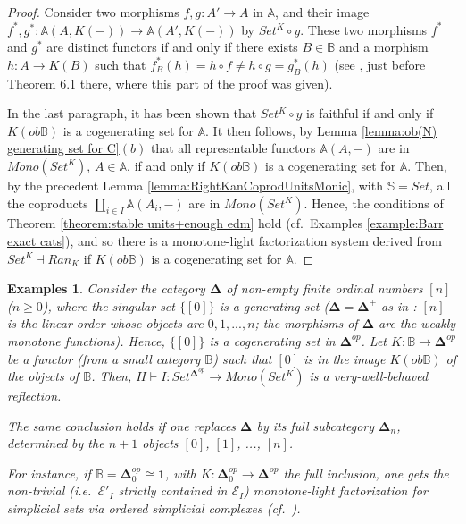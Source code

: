 \documentclass[12pt,a4paper]{amsart}
\newtheorem{examples}[example]{Examples}
\theoremstyle{definition}
\begin{document}
\begin{proof}
Consider two morphisms $f,g:A'\rightarrow A$ in $\mathbb{A}$, and their image $f^*,g^*:\mathbb{A}(A,K(-))\rightarrow \mathbb{A}(A',K(-))$ by $Set^K\circ y$. These two morphisms $f^*$ and $g^*$ are distinct functors if and only if there exists $B\in\mathbb{B}$ and a morphism $h:A\rightarrow K(B)$ such that $f^*_B(h)=h\circ f\neq h\circ g=g^*_B(h)$ (see \cite{X:concordant&monotone}, just before Theorem 6.1 there, where this part of the proof was given).

In the last paragraph, it has been shown that $Set^K\circ y$ is faithful if and only if $K(ob\mathbb{B})$ is a cogenerating set for $\mathbb{A}$. It then follows, by Lemma \ref{lemma:ob(N) generating set for C}$(b)$ that all representable functors $\mathbb{A}(A,-)$ are in $Mono(Set^K)$, $A\in\mathbb{A}$, if and only if $K(ob\mathbb{B})$ is a cogenerating set for $\mathbb{A}$. Then, by the precedent Lemma \ref{lemma:RightKanCoprodUnitsMonic}, with $\mathbb{S}=Set$, all the coproducts $\coprod_{i\in I}\mathbb{A}(A_i,-)$ are in $Mono(Set^K)$. Hence, the conditions of Theorem \ref{theorem:stable units+enough edm} hold (cf.\ Examples \ref{example:Barr exact cats}), and so there is a monotone-light factorization system derived from $Set^K\dashv Ran_K$ if $K(ob\mathbb{B})$ is a cogenerating set for $\mathbb{A}$.\end{proof}

\begin{examples}\label{example:m-l fact simplicial sets}
Consider the category $\mathbf{\Delta}$ of non-empty finite ordinal numbers $[n]$ ($n\geq 0$), where the singular set $\{[0]\}$ is a generating set ($\mathbf{\Delta}=\mathbf{\Delta}^+$ as in \cite[VII.5]{SM:cat}: $[n]$ is the linear order whose objects are $0,1,...,n$; the morphisms of $\mathbf{\Delta}$ are the weakly monotone functions). Hence, $\{[0]\}$ is a cogenerating set in $\mathbf{\Delta}^{op}$. Let $K:\mathbb{B}\rightarrow \mathbf{\Delta}^{op}$ be a functor (from a small category $\mathbb{B}$) such that $[0]$ is in the image $K(ob\mathbb{B})$ of the objects of $\mathbb{B}$. Then, $H\vdash I:Set^{\mathbf{\Delta}^{op}}\rightarrow Mono(Set^K)$ is a very-well-behaved reflection.

The same conclusion holds if one replaces $\mathbf{\Delta}$ by its full subcategory $\mathbf{\Delta}_n$, determined by the $n+1$ objects $[0]$, $[1]$, ..., $[n]$.

For instance, if $\mathbb{B}=\mathbf{\Delta}^{op}_0\cong \mathbf{1}$, with $K:\mathbf{\Delta}^{op}_0\rightarrow\mathbf{\Delta}^{op}$ the full inclusion, one gets the non-trivial (i.e.\ $\mathcal{E}'_I$ strictly contained in $\mathcal{E}_I$) monotone-light factorization for simplicial sets via ordered simplicial complexes (cf.\ \cite{X:simplicialsets}).
\end{examples}
\end{document}
